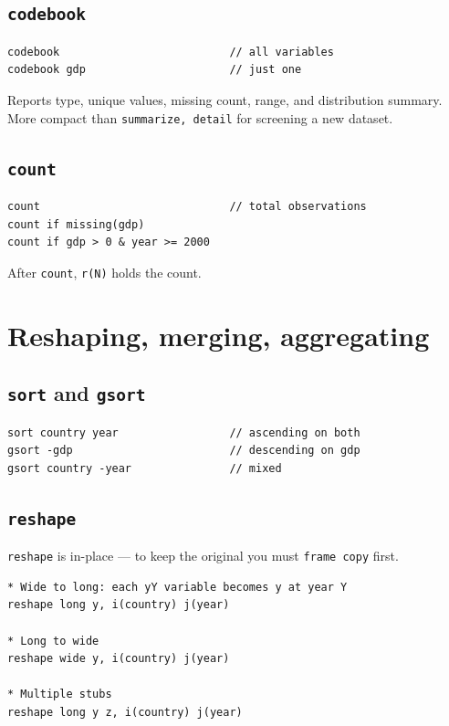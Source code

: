 \documentclass[11pt,letterpaper]{article}
\begin{document}
\subsection{\texttt{codebook}}

\begin{lstlisting}
codebook                          // all variables
codebook gdp                      // just one
\end{lstlisting}

Reports type, unique values, missing count, range, and distribution
summary.  More compact than \texttt{summarize, detail} for screening
a new dataset.

\subsection{\texttt{count}}

\begin{lstlisting}
count                             // total observations
count if missing(gdp)
count if gdp > 0 & year >= 2000
\end{lstlisting}

After \texttt{count}, \texttt{r(N)} holds the count.

\section{Reshaping, merging, aggregating}

\subsection{\texttt{sort} and \texttt{gsort}}

\begin{lstlisting}
sort country year                 // ascending on both
gsort -gdp                        // descending on gdp
gsort country -year               // mixed
\end{lstlisting}

\subsection{\texttt{reshape}}

\texttt{reshape} is in-place — to keep the original you must
\texttt{frame copy} first.

\begin{lstlisting}
* Wide to long: each yY variable becomes y at year Y
reshape long y, i(country) j(year)

* Long to wide
reshape wide y, i(country) j(year)

* Multiple stubs
reshape long y z, i(country) j(year)
\end{lstlisting}
\end{document}
